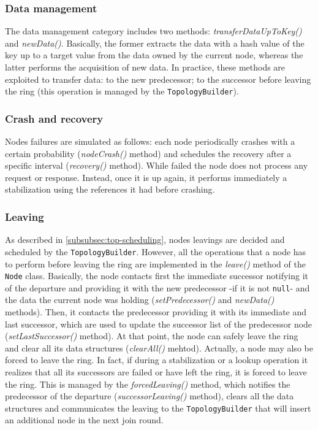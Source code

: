 \documentclass[11pt,twocolumn,letterpaper]{article}
\begin{document}
	\subsubsection{Data management}
	\label{subsubsec:data-management}
	The data management category includes two methods: \textit{transferDataUpToKey()} and \textit{newData()}. \newline
	Basically, the former extracts the data with a hash value of the key up to a target value from the data owned by the current node, whereas the latter performs the acquisition of new data. In practice, these methods are exploited to transfer data: to the new predecessor; to the successor before leaving the ring (this operation is managed by the \texttt{TopologyBuilder}). 
	
	\subsubsection{Crash and recovery}
	\label{subsubsec:crash-n-recovery}
	Nodes failures are simulated as follows: each node periodically crashes with a certain probability (\textit{nodeCrash()} method) and schedules the recovery after a specific interval (\textit{recovery()} method). While failed the node does not process any request or response. Instead, once it is up again, it performs immediately a stabilization using the references it had before crashing.
	
	\subsubsection{Leaving}
	\label{subsubsec:leaving}
	As described in \cref{subsubsec:top-scheduling}, nodes leavings are decided and scheduled by the \texttt{TopologyBuilder}. However, all the operations that a node has to perform before leaving the ring are implemented in the \textit{leave()} method
	of the \texttt{Node} class. \newline
	Basically, the node contacts first the immediate successor notifying it of the departure and providing it with the new predecessor -if it is not \texttt{null}- and the data the current node was holding (\textit{setPredecessor()} and \textit{newData()} methods). Then, it contacts the predecessor providing it with its immediate and last successor, which are used to update the successor list of the predecessor node (\textit{setLastSuccessor()} method). At that point, the node can safely leave the ring and clear all its data structures (\textit{clearAll()} mehtod). \newline
	Actually, a node may also be forced to leave the ring. In fact, if during a stabilization or a lookup operation it realizes that all its successors are failed or have left the ring, it is forced to leave the ring. This is managed by the \textit{forcedLeaving()} method, which notifies the predecessor of the departure (\textit{successorLeaving()} method), clears all the data structures and communicates the leaving to the \texttt{TopologyBuilder} that will insert an additional node in the next join round.
		
\end{document}

